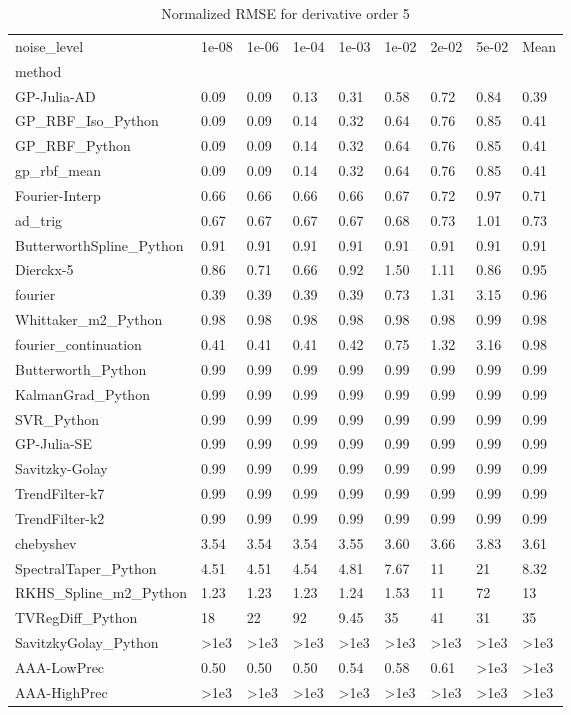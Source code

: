 \begin{table}
\caption{Normalized RMSE for derivative order 5}
\label{tab:nrmse_order_5}
\begin{tabular}{lllllllll}
\toprule
noise_level & 1e-08 & 1e-06 & 1e-04 & 1e-03 & 1e-02 & 2e-02 & 5e-02 & Mean \\
method &  &  &  &  &  &  &  &  \\
\midrule
GP-Julia-AD & 0.09 & 0.09 & 0.13 & 0.31 & 0.58 & 0.72 & 0.84 & 0.39 \\
GP_RBF_Iso_Python & 0.09 & 0.09 & 0.14 & 0.32 & 0.64 & 0.76 & 0.85 & 0.41 \\
GP_RBF_Python & 0.09 & 0.09 & 0.14 & 0.32 & 0.64 & 0.76 & 0.85 & 0.41 \\
gp_rbf_mean & 0.09 & 0.09 & 0.14 & 0.32 & 0.64 & 0.76 & 0.85 & 0.41 \\
Fourier-Interp & 0.66 & 0.66 & 0.66 & 0.66 & 0.67 & 0.72 & 0.97 & 0.71 \\
ad_trig & 0.67 & 0.67 & 0.67 & 0.67 & 0.68 & 0.73 & 1.01 & 0.73 \\
ButterworthSpline_Python & 0.91 & 0.91 & 0.91 & 0.91 & 0.91 & 0.91 & 0.91 & 0.91 \\
Dierckx-5 & 0.86 & 0.71 & 0.66 & 0.92 & 1.50 & 1.11 & 0.86 & 0.95 \\
fourier & 0.39 & 0.39 & 0.39 & 0.39 & 0.73 & 1.31 & 3.15 & 0.96 \\
Whittaker_m2_Python & 0.98 & 0.98 & 0.98 & 0.98 & 0.98 & 0.98 & 0.99 & 0.98 \\
fourier_continuation & 0.41 & 0.41 & 0.41 & 0.42 & 0.75 & 1.32 & 3.16 & 0.98 \\
Butterworth_Python & 0.99 & 0.99 & 0.99 & 0.99 & 0.99 & 0.99 & 0.99 & 0.99 \\
KalmanGrad_Python & 0.99 & 0.99 & 0.99 & 0.99 & 0.99 & 0.99 & 0.99 & 0.99 \\
SVR_Python & 0.99 & 0.99 & 0.99 & 0.99 & 0.99 & 0.99 & 0.99 & 0.99 \\
GP-Julia-SE & 0.99 & 0.99 & 0.99 & 0.99 & 0.99 & 0.99 & 0.99 & 0.99 \\
Savitzky-Golay & 0.99 & 0.99 & 0.99 & 0.99 & 0.99 & 0.99 & 0.99 & 0.99 \\
TrendFilter-k7 & 0.99 & 0.99 & 0.99 & 0.99 & 0.99 & 0.99 & 0.99 & 0.99 \\
TrendFilter-k2 & 0.99 & 0.99 & 0.99 & 0.99 & 0.99 & 0.99 & 0.99 & 0.99 \\
chebyshev & 3.54 & 3.54 & 3.54 & 3.55 & 3.60 & 3.66 & 3.83 & 3.61 \\
SpectralTaper_Python & 4.51 & 4.51 & 4.54 & 4.81 & 7.67 & 11 & 21 & 8.32 \\
RKHS_Spline_m2_Python & 1.23 & 1.23 & 1.23 & 1.24 & 1.53 & 11 & 72 & 13 \\
TVRegDiff_Python & 18 & 22 & 92 & 9.45 & 35 & 41 & 31 & 35 \\
SavitzkyGolay_Python & >1e3 & >1e3 & >1e3 & >1e3 & >1e3 & >1e3 & >1e3 & >1e3 \\
AAA-LowPrec & 0.50 & 0.50 & 0.50 & 0.54 & 0.58 & 0.61 & >1e3 & >1e3 \\
AAA-HighPrec & >1e3 & >1e3 & >1e3 & >1e3 & >1e3 & >1e3 & >1e3 & >1e3 \\
\bottomrule
\end{tabular}
\end{table}
